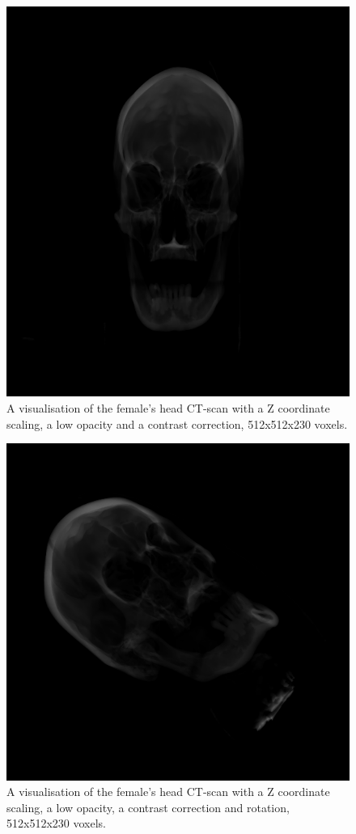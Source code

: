 \documentclass[twoside, english, 11pt]{report}
\begin{document}
\begin{figure}[H]
\centerline{\includegraphics[scale = 0.5]{img/head-op}}
\caption{A visualisation of the female's head CT-scan with a Z coordinate scaling, a low opacity and a contrast correction, 512x512x230 voxels.\label{fig:head-op}}
\end{figure}

\begin{figure}[H]
\centerline{\includegraphics[scale = 0.5]{img/head-op-rot}}
\caption{A visualisation of the female's head CT-scan with a Z coordinate scaling, a low opacity, a contrast correction and rotation, 512x512x230 voxels.\label{fig:head-op-rot}}
\end{figure}
\end{document}
